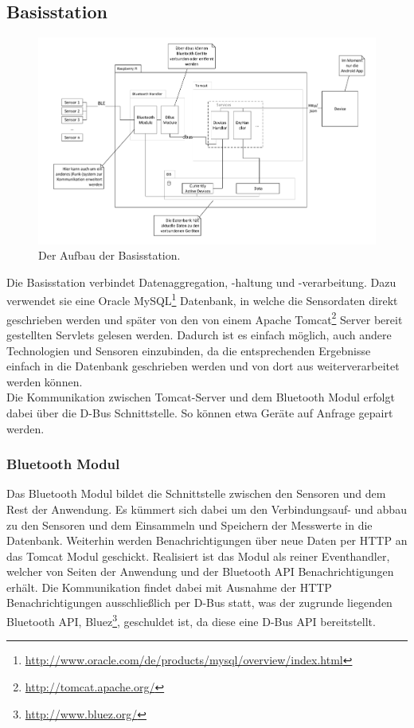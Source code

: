\subsection{Basisstation}
\begin{figure}[htb] 
	\centerline{\includegraphics[scale=.5]{Architektur/BaseStation_v2.pdf} }
	\caption{Der Aufbau der Basisstation.}
\end{figure}

Die Basisstation verbindet Datenaggregation, -haltung und -verarbeitung. Dazu verwendet sie eine Oracle MySQL\footnote{\url{http://www.oracle.com/de/products/mysql/overview/index.html}} Datenbank, in welche die Sensordaten direkt geschrieben werden und später von den von einem Apache Tomcat\footnote{\url{http://tomcat.apache.org/}} Server bereit gestellten Servlets gelesen werden. Dadurch ist es einfach möglich, auch andere Technologien und Sensoren einzubinden, da die entsprechenden Ergebnisse einfach in die Datenbank geschrieben werden und von dort aus weiterverarbeitet werden können.\\
Die Kommunikation zwischen Tomcat-Server und dem Bluetooth Modul erfolgt dabei über die D-Bus Schnittstelle. So können etwa Geräte auf Anfrage gepairt werden.

\subsubsection{Bluetooth Modul}
Das Bluetooth Modul bildet die Schnittstelle zwischen den Sensoren und dem Rest der Anwendung. Es kümmert sich dabei um den Verbindungsauf- und abbau zu den Sensoren und dem Einsammeln und Speichern der Messwerte in die Datenbank. Weiterhin werden Benachrichtigungen über neue Daten per HTTP an das Tomcat Modul geschickt. Realisiert ist das Modul als reiner Eventhandler, welcher von Seiten der Anwendung und der Bluetooth API Benachrichtigungen erhält. Die Kommunikation findet dabei mit Ausnahme der HTTP Benachrichtigungen ausschließlich per D-Bus statt, was der zugrunde liegenden Bluetooth API, Bluez\footnote{\url{http://www.bluez.org/}}, geschuldet ist, da diese eine D-Bus API bereitstellt.

